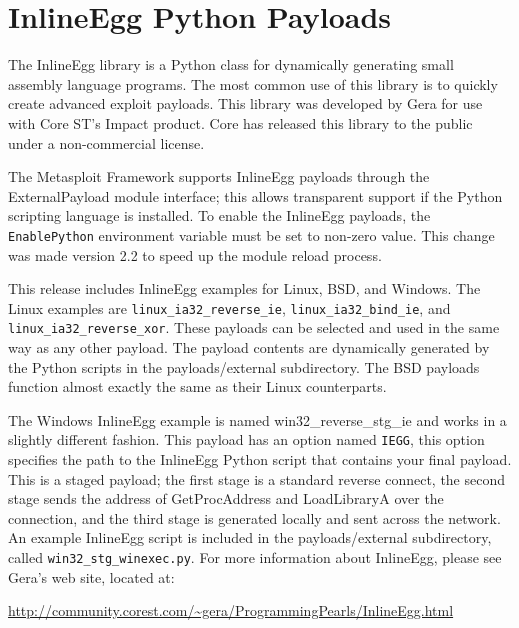 \documentclass{report}
\begin{document}
\section{InlineEgg Python Payloads}
\par
The InlineEgg library is a Python class for dynamically generating small
assembly language programs. The most common use of this library is to quickly
create advanced exploit payloads. This library was developed by Gera for use
with Core ST's Impact product. Core has released this library to the public
under a non-commercial license. 

\par
The Metasploit Framework supports InlineEgg payloads through the ExternalPayload
module interface; this allows transparent support if the Python scripting
language is installed. To enable the InlineEgg payloads, the
\texttt{EnablePython} environment variable must be set to non-zero value. This
change was made version 2.2 to speed up the module reload process. 

\par
This release includes InlineEgg examples for Linux, BSD, and Windows. The Linux
examples are \texttt{linux\_ia32\_reverse\_ie}, \texttt{linux\_ia32\_bind\_ie}, and
\texttt{linux\_ia32\_reverse\_xor}. These payloads can be selected and used in the same
way as any other payload. The payload contents are dynamically generated by the
Python scripts in the payloads/external subdirectory. The BSD payloads function
almost exactly the same as their Linux counterparts. 

\par
The Windows InlineEgg example is named win32\_reverse\_stg\_ie and works in a
slightly different fashion. This payload has an option named \texttt{IEGG}, this option
specifies the path to the InlineEgg Python script that contains your final
payload. This is a staged payload; the first stage is a standard reverse
connect, the second stage sends the address of GetProcAddress and LoadLibraryA
over the connection, and the third stage is generated locally and sent across
the network. An example InlineEgg script is included in the payloads/external
subdirectory, called \texttt{win32\_stg\_winexec.py}. For more information about
InlineEgg, please see Gera's web site, located at: 

\url{http://community.corest.com/~gera/ProgrammingPearls/InlineEgg.html}
\end{document}

